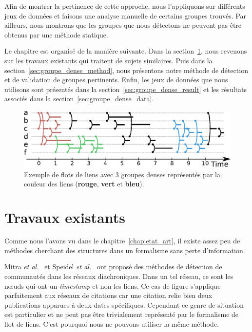 Afin de montrer la pertinence de cette approche, nous l'appliquons sur différents jeux de données et faisons une analyse manuelle de certains groupes trouvés.
Par ailleurs, nous montrons que les groupes que nous détectons ne peuvent pas être obtenus par une méthode statique.

Le chapitre est organisé de la manière suivante.
Dans la section~\ref{sec:groupe_dense_existant}, nous revenons sur les travaux existants qui traitent de sujets similaires.
Puis dans la section~\ref{sec:groupe_dense_method}, nous présentons notre méthode de détection et de validation de groupes pertinents.
Enfin, les jeux de données que nous utilisons sont présentés dans la section~\ref{sec:groupe_dense_result} et les résultats associés dans la section~\ref{sec:groupe_dense_data}.

\begin{figure}
\centering
\includegraphics[width=\linewidth]{img/GroupeDense/GroupExample/Zone_dense.eps}
\caption{Exemple de flots de liens avec 3 groupes denses représentés par la couleur des liens (\textcolor{brique}{\textbf{rouge}}, \textcolor{vert_turquoise}{\textbf{vert}} et \textcolor{bleu_window}{\textbf{bleu}}).
}
\label{fig:exemple_groupe_dens}
\end{figure}

\section{Travaux existants}
\label{sec:groupe_dense_existant}

Comme nous l'avons vu dans le chapitre~\ref{chap:etat_art}, il existe assez peu de méthodes cherchant des structures dans un formalisme sans perte d'information.

Mitra \emph{et al.}~\cite{Mitra2012a} et Speidel \emph{et al.}~\cite{Speidel2015} ont proposé des méthodes de détection de communautés dans les réseaux diachroniques.
Dans un tel réseau, ce sont les n\oe{}uds qui ont un \emph{timestamp} et non les liens.
Ce cas de figure s'applique parfaitement aux réseaux de citations car une citation relie bien deux publications apparues à deux dates spécifiques.
Cependant ce genre de situation est particulier et ne peut pas être trivialement représenté par le formalisme de flot de liens.
C'est pourquoi nous ne pouvons utiliser la même méthode. 

